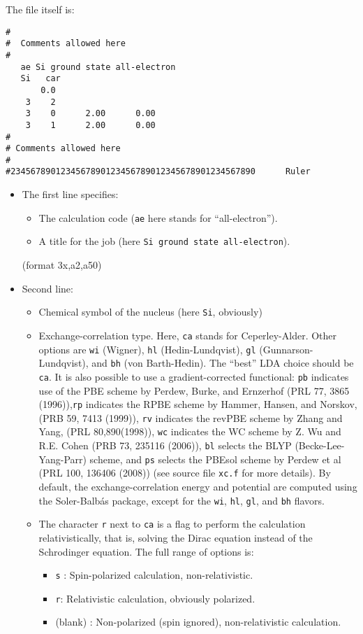 \documentclass[11pt]{article}
\begin{document}
The file itself is:
\begin{verbatim}
#
#  Comments allowed here
#
   ae Si ground state all-electron
   Si   car  
       0.0
    3    2
    3    0      2.00      0.00
    3    1      2.00      0.00
#
# Comments allowed here
#
#2345678901234567890123456789012345678901234567890      Ruler
\end{verbatim}

\begin{itemize}
\item The first line specifies:
	\begin{itemize}
	\item The calculation code ({\tt ae} here stands for ``all-electron'').
	\item A title for the job (here {\tt Si ground state all-electron}).
	\end{itemize} 
	(format 3x,a2,a50)

\item Second line:
	\begin{itemize}

	\item Chemical symbol of the nucleus (here {\tt Si}, obviously)
	\item Exchange-correlation type. Here, {\tt ca} stands for
          Ceperley-Alder. Other options are {\tt wi}
          (Wigner), {\tt hl} (Hedin-Lundqvist), {\tt gl}
          (Gunnarson-Lundqvist), and {\tt bh} (von Barth-Hedin). The
          ``best'' LDA choice should be {\tt ca}.  It is also possible
          to use a gradient-corrected functional: {\tt pb} indicates use
          of the PBE scheme by Perdew, Burke, and Ernzerhof (PRL 77,
          3865 (1996)),{\tt rp} indicates the RPBE
          scheme by Hammer, Hansen, and Norskov, (PRB 59, 7413 (1999)),
          {\tt rv} indicates the revPBE
          scheme by Zhang and Yang, (PRL 80,890(1998)), 
          {\tt wc} indicates the WC
          scheme by Z. Wu and R.E. Cohen (PRB 73, 235116 (2006)),
          {\tt bl} selects the BLYP (Becke-Lee-Yang-Parr) scheme,
          and {\tt ps} selects the PBEsol scheme by Perdew et al (PRL 100, 136406 (2008))
          (see source file {\tt xc.f} for more details).
	  By default, the exchange-correlation energy and potential
	  are computed using the Soler-Balb\'as package, except for
	  the {\tt wi}, {\tt hl}, {\tt gl}, and {\tt bh} flavors. 
   
	\item The character {\tt r} next to {\tt ca} is a flag to perform the
          calculation relativistically, that is, solving the Dirac equation
          instead of the Schrodinger equation. 
	  The full range of options is:
	    \begin{itemize}
		\item {\tt s} : Spin-polarized calculation, non-relativistic.
		\item {\tt r}: Relativistic calculation, obviously polarized.
		\item (blank) : Non-polarized (spin ignored), non-relativistic
           		calculation.
	    \end{itemize}
	\end{itemize}
	

\end{itemize}
\end{document}
